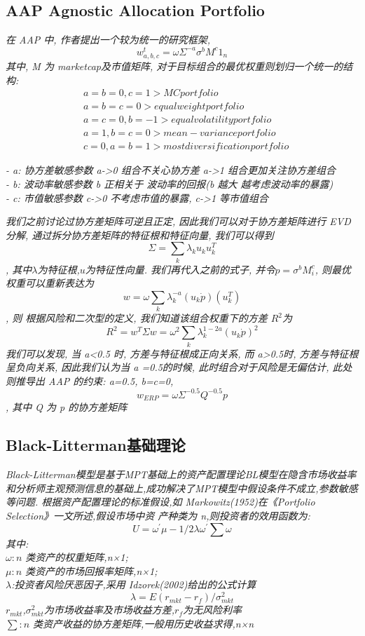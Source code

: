 \documentclass{scrartcl}
\numberwithin{equation}{section}
\begin{document}
\subsection{AAP Agnostic Allocation Portfolio}
\textsl{在 AAP 中, 作者提出一个较为统一的研究框架, $$w_{a,b,c}^t = \omega \Sigma^{-a}\sigma^bM^c1_n$$其中, M 为 marketcap及市值矩阵, 对于目标组合的最优权重则划归一个统一的结构:}
\begin{equation*}
    \begin{aligned}
         & a=b=0 , c=1 > MC portfolio                  \\
         & a=b=c=0 > equal weight portfolio            \\
         & a=c=0, b=-1  > equal volatility portfolio   \\
         & a=1, b=c=0 > mean-variance portfolio        \\
         & c=0, a=b=1 > most diversification portfolio
    \end{aligned}
\end{equation*}

\textsl{
    - a: 协方差敏感参数 a->0 组合不关心协方差  a->1 组合更加关注协方差组合\\
    - b: 波动率敏感参数 b 正相关于 波动率的回报(b 越大 越考虑波动率的暴露) \\
    - c: 市值敏感参数  c->0  不考虑市值的暴露,  c->1 等市值组合
}

\textsl{
    我们之前讨论过协方差矩阵可逆且正定, 因此我们可以对于协方差矩阵进行 EVD分解, 通过拆分协方差矩阵的特征根和特征向量, 我们可以得到$$\Sigma = \sum_k\lambda_ku_ku_k^T$$, 其中$\lambda$为特征根,$u$为特征性向量. 我们再代入之前的式子, 并令$p=\sigma^bM_i^c$, 则最优权重可以重新表达为$$w = \omega \sum_k \lambda_k^{-a} (u_k  \dot p)(u_k^T)$$, 则 根据风险和二次型的定义, 我们知道该组合权重下的方差 $R^2 $为  $$R^2 = w^T \Sigma w = \omega^2\sum_k \lambda_k^{1-2a}(u_k \dot p)^2$$我们可以发现, 当 a<0.5 时, 方差与特征根成正向关系, 而 a>0.5时, 方差与特征根呈负向关系, 因此我们认为当 a =0.5的时候, 此时组合对于风险是无偏估计, 此处则推导出 AAP 的约束: a=0.5, b=c=0, $$w_{ERP}= \omega \Sigma^{-0.5} Q^{-0.5} p $$, 其中 Q 为 p 的协方差矩阵
}



\subsection{Black-Litterman基础理论}
\textsl{Black-Litterman模型是基于MPT基础上的资产配置理论BL模型在隐含市场收益率和分析师主观预测信息的基础上,成功解决了MPT模型中假设条件不成立,参数敏感等问题.
根据资产配置理论的标准假设,如 Markowitz(1952)在《Portfolio Selection》一文所述,假设市场中资
产种类为 n,则投资者的效用函数为:
$$U=\omega^{'}\mu- 1/2 \lambda \omega^{'} \sum \omega $$
其中:\\
$\omega:n$ 类资产的权重矩阵,n×1;\\
$\mu:n$ 类资产的市场回报率矩阵,n×1; \\
$\lambda$:投资者风险厌恶因子,采用 Idzorek(2002)给出的公式计算
$$\lambda=E(r_{mkt} -r_f)/\sigma^2_{mkt}$$
$r_{mkt}$,$\sigma^2_{mkt}$为市场收益率及市场收益方差,$r_f$为无风险利率\\
$\sum:n$ 类资产收益的协方差矩阵,一般用历史收益求得,n×n
}
\end{document}
